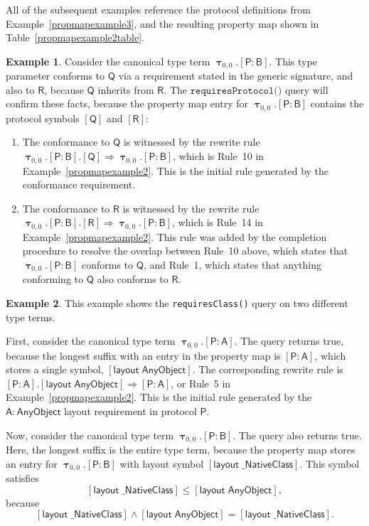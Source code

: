 \documentclass[headsepline,bibliography=totoc]{scrreport}
\newcommand{\namesym}[1]{\mathsf{#1}}
\newcommand{\proto}[1]{\bm{\mathsf{#1}}}
\newcommand{\protosym}[1]{[\proto{#1}]}
\newcommand{\genericsym}[2]{\bm{\uptau}_{#1,#2}}
\newcommand{\assocsym}[2]{[\proto{#1}\colon\namesym{#2}]}
\newcommand{\layoutsym}[1]{[\mathsf{layout\;#1}]}
\theoremstyle{definition}
\newtheorem{example}{Example}[chapter]
\theoremstyle{definition}
\theoremstyle{definition}
\begin{document}
All of the subsequent examples reference the protocol definitions from Example~\ref{propmapexample3}, and the resulting property map shown in Table~\ref{propmapexample2table}.
\begin{example} Consider the canonical type term $\genericsym{0}{0}.\assocsym{P}{B}$. This type parameter conforms to $\proto{Q}$ via a requirement stated in the generic signature, and also to $\proto{R}$, because $\proto{Q}$ inherits from $\proto{R}$. The $\texttt{requiresProtocol()}$ query will confirm these facts, because the property map entry for $\genericsym{0}{0}.\assocsym{P}{B}$ contains the protocol symbols $\protosym{Q}$ and $\protosym{R}$:
\begin{enumerate}
\item The conformance to $\proto{Q}$ is witnessed by the rewrite rule $\genericsym{0}{0}.\assocsym{P}{B}.\protosym{Q}\Rightarrow \genericsym{0}{0}.\assocsym{P}{B}$, which is Rule~10 in Example~\ref{propmapexample2}. This is the initial rule generated by the conformance requirement.
\item The conformance to $\proto{R}$ is witnessed by the rewrite rule $\genericsym{0}{0}.\assocsym{P}{B}.\protosym{R}\Rightarrow \genericsym{0}{0}.\assocsym{P}{B}$, which is Rule~14 in Example~\ref{propmapexample2}. This rule was added by the completion procedure to resolve the overlap between Rule~10 above, which states that $\genericsym{0}{0}.\assocsym{P}{B}$ conforms to $\proto{Q}$, and Rule~1, which states that anything conforming to $\proto{Q}$ also conforms to $\proto{R}$.
\end{enumerate}
\end{example}
\begin{example} This example shows the \texttt{requiresClass()} query on two different type terms.

First, consider the canonical type term $\genericsym{0}{0}.\assocsym{P}{A}$. The query returns true, because the longest suffix with an entry in the property map is $\assocsym{P}{A}$, which stores a single symbol, $\layoutsym{AnyObject}$. The corresponding rewrite rule is $\assocsym{P}{A}.\layoutsym{AnyObject}\Rightarrow\assocsym{P}{A}$, or Rule~5 in Example~\ref{propmapexample2}. This is the initial rule generated by the $\namesym{A}\colon\namesym{AnyObject}$ layout requirement in protocol $\proto{P}$.

Now, consider the canonical type term $\genericsym{0}{0}.\assocsym{P}{B}$. The query also returns true. Here, the longest suffix is the entire type term, because the property map stores an entry for $\genericsym{0}{0}.\assocsym{P}{B}$ with layout symbol $\layoutsym{\_NativeClass}$. This symbol satisfies
\[\layoutsym{\_NativeClass}\leq\layoutsym{AnyObject},\]
because
\[\layoutsym{\_NativeClass}\wedge \layoutsym{AnyObject}=\layoutsym{\_NativeClass}.\]
\end{example}
\end{document}
